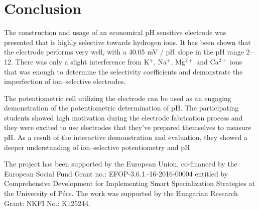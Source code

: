 \documentclass[manuscript=article, journal=jceda8]{achemso}
\begin{document}
\section{Conclusion}
	
The construction and usage of an economical pH sensitive electrode was presented that is highly selective towards hydrogen ions. It has been shown that the electrode performs very well, with a 40.05 mV / pH slope in the pH range 2--12. There was only a slight interference from K$^+$, Na$^+$, Mg$^{2+}$ and Ca$^{2+}$ ions that was enough to determine the selectivity coefficients and demonstrate the imperfection of ion--selective electrodes.

The potentiometric cell utilizing the electrode can be used as an engaging demonstration of the potentiometric determination of pH. The participating students showed high motivation during the electrode fabrication process and they were excited to use electrodes that they've prepared themselves to measure pH. As a result of the interactive demonstration and evaluation, they showed a deeper understanding of ion--selective potentiometry and pH.




\begin{acknowledgement}
The project has been supported by the European Union, co-financed by the European Social Fund Grant no.: EFOP-3.6.1.-16-2016-00004 entitled by Comprehensive Development for Implementing Smart Specialization Strategies at the University of Pécs. The work was supported by the Hungarian Research Grant: NKFI No.: K125244.
\end{acknowledgement}


\end{document}
